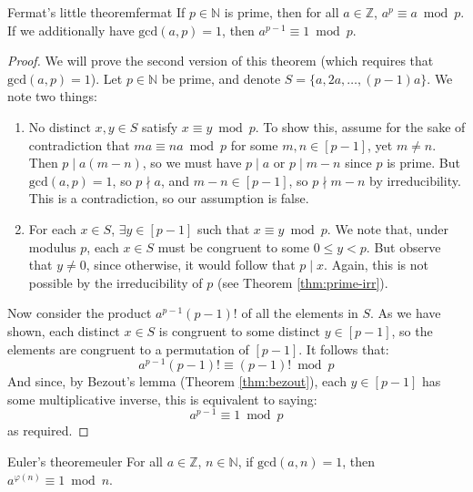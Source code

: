 \documentclass{article}
\theoremstyle{definition}
\def\gcd{\textrm{gcd}}
\def\divides{\mid}
\begin{document}
\begin{theorem}{Fermat's little theorem}{fermat}
  If $p \in \mathbb{N}$ is prime, then for all $a \in \mathbb{Z}$, $a^p \equiv
  a \bmod p$. If we additionally have $\gcd(a,p) = 1$, then $a^{p-1} \equiv 1
  \bmod p$.
\end{theorem}
\begin{proof}
  We will prove the second version of this theorem (which requires that
  $\gcd(a,p) = 1$). Let $p \in \mathbb{N}$ be prime, and denote $S = \{a, 2a,
  \dots, (p-1)a\}$. We note two things:
  \begin{enumerate}
    \item No distinct $x,y \in S$ satisfy $x \equiv y \bmod p$. To show this,
      assume for the sake of contradiction that $ma \equiv na \bmod p$ for some
      $m,n \in [p-1]$, yet $m \neq n$. Then $p \divides a(m-n)$, so we must have
      $p \divides a$ or $p \divides m-n$ since $p$ is prime. But $\gcd(a,p)=1$,
      so $p \nmid a$, and $m-n \in [p-1]$, so $p \nmid m-n$ by irreducibility.
      This is a contradiction, so our assumption is false.
    \item For each $x \in S$, $\exists y \in [p-1]$ such that $x \equiv y
      \bmod p$. We note that, under modulus $p$, each $x \in S$ must be
      congruent to some $0 \le y < p$. But observe that $y \neq 0$, since
      otherwise, it would follow that $p \divides x$. Again, this is not
      possible by the irreducibility of $p$ (see Theorem \ref{thm:prime-irr}).
  \end{enumerate}
  Now consider the product $a^{p-1}(p-1)!$ of all the elements in $S$. As we
  have shown, each distinct $x \in S$ is congruent to some distinct $y \in
  [p-1]$, so the elements are congruent to a permutation of $[p-1]$. It follows
  that:
  \begin{equation*}
    a^{p-1}(p-1)! \equiv (p-1)! \bmod p
  \end{equation*}
  And since, by Bezout's lemma (Theorem \ref{thm:bezout}), each $y \in [p-1]$
  has some multiplicative inverse, this is equivalent to saying:
  \begin{equation*}
    a^{p-1} \equiv 1 \bmod p
  \end{equation*}
  as required.
\end{proof}

\begin{theorem}{Euler's theorem}{euler}
  For all $a \in \mathbb{Z}$, $n \in \mathbb{N}$, if $\gcd(a,n) = 1$, then
  $a^{\varphi(n)} \equiv 1 \bmod n$.
\end{theorem}
\end{document}
